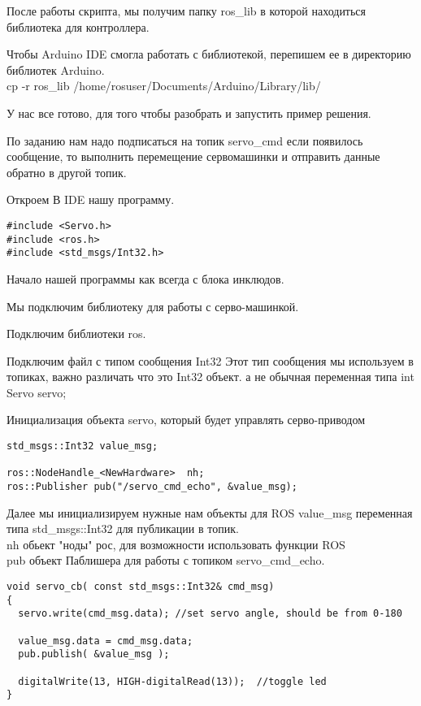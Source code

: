 После работы скрипта, мы получим папку ros\_lib в которой находиться библиотека для контроллера.

Чтобы Arduino IDE смогла работать с библиотекой, перепишем ее в директорию библиотек Arduino.\\
cp -r ros\_lib /home/rosuser/Documents/Arduino/Library/lib/

У нас все готово, для того чтобы разобрать и запустить пример решения.

По заданию нам надо подписаться на топик servo\_cmd если появилось сообщение, то выполнить перемещение сервомашинки и отправить данные обратно в другой топик.

Откроем В IDE нашу программу.

\begin{verbatim}
#include <Servo.h> 
#include <ros.h>
#include <std_msgs/Int32.h>
\end{verbatim}
Начало нашей программы как всегда с блока инклюдов.

Мы подключим библиотеку для работы с серво-машинкой.

Подключим библиотеки ros.

Подключим файл с типом сообщения Int32 Этот тип сообщения мы используем в топиках, важно различать что это Int32 объект. а не обычная переменная типа int\\
Servo servo;

Инициализация объекта servo, который будет управлять серво-приводом\\

\begin{verbatim}
std_msgs::Int32 value_msg;

ros::NodeHandle_<NewHardware>  nh;
ros::Publisher pub("/servo_cmd_echo", &value_msg);
\end{verbatim}

Далее мы инициализируем нужные нам объекты для ROS
value\_msg переменная типа std\_msgs::Int32 для публикации в топик.\\
nh обьект "ноды" рос, для возможности использовать функции ROS\\
pub объект Паблишера для работы с топиком servo\_cmd\_echo.
\begin{verbatim}
void servo_cb( const std_msgs::Int32& cmd_msg)
{
  servo.write(cmd_msg.data); //set servo angle, should be from 0-180  

  value_msg.data = cmd_msg.data;
  pub.publish( &value_msg );

  digitalWrite(13, HIGH-digitalRead(13));  //toggle led  
}
\end{verbatim}

